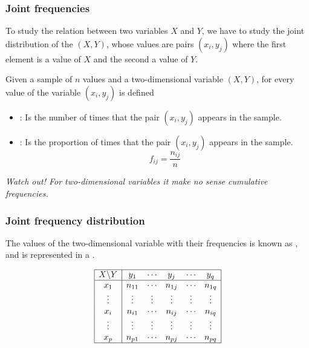 \begin{frame}
\frametitle{Joint frequencies}
To study the relation between two variables $X$ and $Y$, we have to study the joint distribution of the
 $(X,Y)$, whose values are pairs $(x_i,y_j)$ where the first element is a value of
$X$ and the second a value of $Y$.

\begin{definition}
Given a sample of $n$ values and a two-dimensional variable $(X,Y)$, for every value of the variable $(x_i,y_j)$
is defined
\begin{itemize}
\item {}: Is the number of times that the pair $(x_i,y_j)$ appears in the sample.
\item {}: Is the proportion of times that the pair $(x_i,y_j)$ appears in the
sample.
\[
f_{ij}=\frac{n_{ij}}{n}
\]
\end{itemize}
\end{definition}

\begin{center}
\alert{\emph{Watch out! For two-dimensional variables it make no sense cumulative frequencies.}}
\end{center}
\end{frame}


\begin{frame}
\frametitle{Joint frequency distribution}
The values of the two-dimensional variable with their frequencies is known as ,
and is represented in a .

\[
\begin{array}{|c|ccccc|}
\hline
X\backslash Y & y_1 & \cdots & y_j & \cdots & y_q\\
\hline
x_1 & n_{11} & \cdots & n_{1j} & \cdots & n_{1q}\\
\vdots & \vdots & \vdots & \vdots & \vdots & \vdots\\
x_i & n_{i1} & \cdots & n_{ij} & \cdots & n_{iq}\\
\vdots & \vdots & \vdots & \vdots & \vdots & \vdots\\
x_p & n_{p1} & \cdots & n_{pj} & \cdots & n_{pq}\\
\hline
\end{array}
\]
\end{frame}


